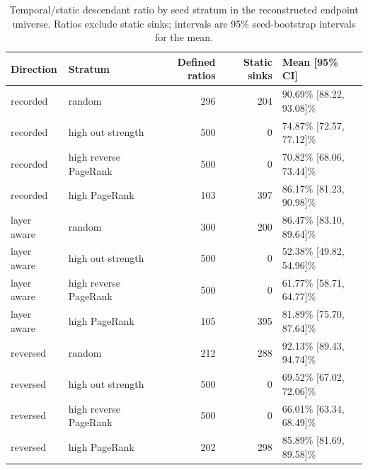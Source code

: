 \begin{table}[htbp]\centering\small
\caption{Temporal/static descendant ratio by seed stratum in the reconstructed endpoint universe. Ratios exclude static sinks; intervals are 95\% seed-bootstrap intervals for the mean.}\label{tab:temporal}
\begin{tabular}{p{2.0cm}p{3.2cm}rrp{3.2cm}}\toprule Direction & Stratum & Defined ratios & Static sinks & Mean [95\% CI]\\\midrule
recorded & random & 296 & 204 & 90.69\% [88.22, 93.08]\%\\
recorded & high out strength & 500 & 0 & 74.87\% [72.57, 77.12]\%\\
recorded & high reverse PageRank & 500 & 0 & 70.82\% [68.06, 73.44]\%\\
recorded & high PageRank & 103 & 397 & 86.17\% [81.23, 90.98]\%\\
layer aware & random & 300 & 200 & 86.47\% [83.10, 89.64]\%\\
layer aware & high out strength & 500 & 0 & 52.38\% [49.82, 54.96]\%\\
layer aware & high reverse PageRank & 500 & 0 & 61.77\% [58.71, 64.77]\%\\
layer aware & high PageRank & 105 & 395 & 81.89\% [75.70, 87.64]\%\\
reversed & random & 212 & 288 & 92.13\% [89.43, 94.74]\%\\
reversed & high out strength & 500 & 0 & 69.52\% [67.02, 72.06]\%\\
reversed & high reverse PageRank & 500 & 0 & 66.01\% [63.34, 68.49]\%\\
reversed & high PageRank & 202 & 298 & 85.89\% [81.69, 89.58]\%\\
\bottomrule\end{tabular}\end{table}
